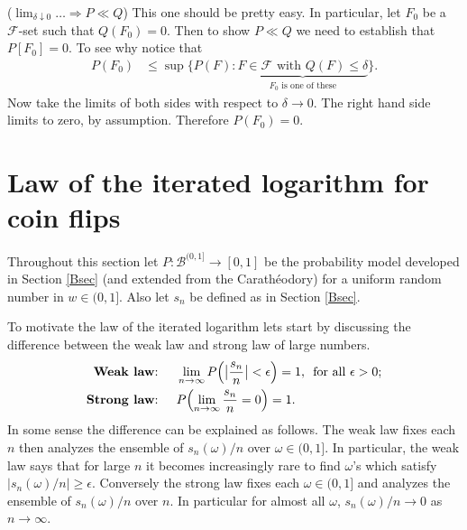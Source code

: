 \begin{exerciseproof}
({\sl $ \lim_{\delta\downarrow 0}\ldots \Longrightarrow P\ll Q$}) This one should be pretty easy. In particular,  let $F_0$ be a $ \mathcal F$-set such that $Q(F_0)=0$. Then to show $P\ll Q$ we need to establish that $P[F_0]=0$. To see why notice that
\begin{align*}
P(F_0)
&\leq  \sup\{ P(F)\colon \underbrace{\text{$F\in \mathcal F$ with $Q(F)\leq \delta$}}_{\text{$F_0$ is one of these}} \}.
\end{align*}
Now take the limits of both sides with respect to $\delta\rightarrow 0$. The right hand side limits to zero, by assumption. Therefore $P(F_0) = 0 $.
\end{exerciseproof}





\clearpage
\section{Law of the iterated logarithm for coin flips}


\begin{sectionassumption}
Throughout this section let $P:\mathcal B^{(0,1]}\rightarrow [0,1]$ be the probability model developed in Section \ref{Bsec} (and extended from the Carath\'eodory) for a uniform random number in $w\in (0,1]$. Also let $s_n$ be defined as in Section \ref{Bsec}.
\end{sectionassumption}


To motivate the law of the iterated logarithm lets start by discussing the difference between the weak law and strong law of large numbers.
\begin{align*}
\text{{\bf Weak law}:   } &\quad \lim_{n\rightarrow \infty} P\Bigl(\bigl|\frac{s_n}{n}\bigr| < \epsilon \Bigr) = 1, \,\text{ for all $\epsilon>0$;}\\
\text{{\bf Strong law}:   } &\quad  P\Bigl(\lim_{n\rightarrow \infty} \frac{s_n}{n} = 0 \Bigr) = 1.
\end{align*}
In some sense the difference can be explained as follows. The weak law fixes each $n$ then analyzes the ensemble of $s_n(\omega)/n$
over $\omega\in (0,1]$. In particular, the weak law says that for large $n$ it becomes increasingly rare to find $\omega$'s which satisfy $|s_n(\omega)/n| \geq \epsilon$.  Conversely the strong law fixes each $\omega\in (0,1]$ and analyzes the ensemble of $s_n(\omega)/n$  over $n$. In particular for almost all $\omega$,  $s_n(\omega)/n\rightarrow 0$ as $n\rightarrow \infty$.

